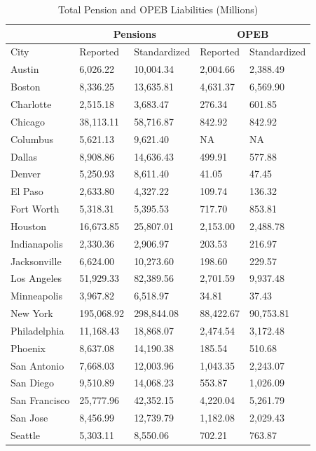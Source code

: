 \documentclass[12pt]{article}
\begin{document}
\begin{table}[h]
\centering
\caption{Total Pension and OPEB Liabilities
(Millions)}
\begin{tabular}{l|l|l|l|l}
\hline
& \multicolumn{2}{c}{Pensions} & \multicolumn{2}{c}{OPEB} \\
\hline
City &  Reported &  Standardized &  Reported &  Standardized\\
\hline
Austin & 6,026.22 & 10,004.34 & 2,004.66 & 2,388.49\\
\hline
Boston & 8,336.25 & 13,635.81 & 4,631.37 & 6,569.90\\
\hline
Charlotte & 2,515.18 & 3,683.47 & 276.34 & 601.85\\
\hline
Chicago & 38,113.11 & 58,716.87 & 842.92 & 842.92\\
\hline
Columbus & 5,621.13 & 9,621.40 & NA & NA\\
\hline
Dallas & 8,908.86 & 14,636.43 & 499.91 & 577.88\\
\hline
Denver & 5,250.93 & 8,611.40 & 41.05 & 47.45\\
\hline
El Paso & 2,633.80 & 4,327.22 & 109.74 & 136.32\\
\hline
Fort Worth & 5,318.31 & 5,395.53 & 717.70 & 853.81\\
\hline
Houston & 16,673.85 & 25,807.01 & 2,153.00 & 2,488.78\\
\hline
Indianapolis & 2,330.36 & 2,906.97 & 203.53 & 216.97\\
\hline
Jacksonville & 6,624.00 & 10,273.60 & 198.60 & 229.57\\
\hline
Los Angeles & 51,929.33 & 82,389.56 & 2,701.59 & 9,937.48\\
\hline
Minneapolis & 3,967.82 & 6,518.97 & 34.81 & 37.43\\
\hline
New York & 195,068.92 & 298,844.08 & 88,422.67 & 90,753.81\\
\hline
Philadelphia & 11,168.43 & 18,868.07 & 2,474.54 & 3,172.48\\
\hline
Phoenix & 8,637.08 & 14,190.38 & 185.54 & 510.68\\
\hline
San Antonio & 7,668.03 & 12,003.96 & 1,043.35 & 2,243.07\\
\hline
San Diego & 9,510.89 & 14,068.23 & 553.87 & 1,026.09\\
\hline
San Francisco & 25,777.96 & 42,352.15 & 4,220.04 & 5,261.79\\
\hline
San Jose & 8,456.99 & 12,739.79 & 1,182.08 & 2,029.43\\
\hline
Seattle & 5,303.11 & 8,550.06 & 702.21 & 763.87\\
\hline
\end{tabular}
\end{table}
\end{document}

